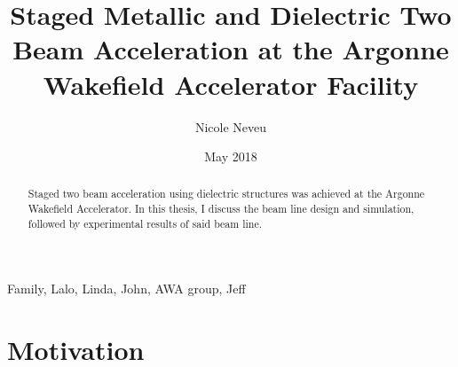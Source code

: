 \documentclass{iitthesis}
\begin{document}
\title{Staged Metallic and Dielectric Two Beam Acceleration at the Argonne Wakefield Accelerator Facility}

\author{Nicole Neveu }
\date{May 2018}
\copyrightnoticetrue      %
\maketitle                %


\prelimpages         %

\begin{acknowledgement}     %
	\par  Family, Lalo, Linda, John, AWA group, Jeff
\end{acknowledgement}

\tableofcontents
\clearpage

\listoftables

\clearpage

\listoffigures

\clearpage


\listofsymbols
{}

\clearpage

\begin{abstract}           %
	\par Staged two beam acceleration using dielectric structures was achieved
	at the Argonne Wakefield Accelerator. In this thesis, I discuss the beam 
	line design and simulation, followed by experimental results of said
	beam line.  
\end{abstract}


\textpages     %


\section{Motivation} \label{sec:int}
\end{document}
